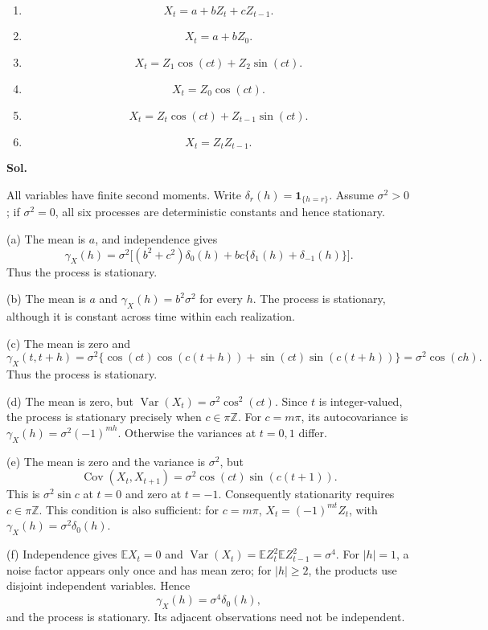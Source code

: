 \documentclass[lang=en,11pt,a4paper,citestyle =authoryear]{elegantpaper}
\begin{document}
\begin{enumerate}
    \item[(a)]
    \[
    X_t=a+bZ_t+cZ_{t-1}.
    \]

    \item[(b)]
    \[
    X_t=a+bZ_0.
    \]

    \item[(c)]
    \[
    X_t=Z_1\cos(ct)+Z_2\sin(ct).
    \]

    \item[(d)]
    \[
    X_t=Z_0\cos(ct).
    \]

    \item[(e)]
    \[
    X_t=Z_t\cos(ct)+Z_{t-1}\sin(ct).
    \]

    \item[(f)]
    \[
    X_t=Z_tZ_{t-1}.
    \]
\end{enumerate}
\vspace{0.5em}
\textbf{Sol.} \par
All variables have finite second moments. Write $\delta_r(h)=\mathbf1_{\{h=r\}}$.
Assume $\sigma^2>0$; if $\sigma^2=0$, all six processes are deterministic constants
and hence stationary.\par
(a) The mean is $a$, and independence gives
\[
\gamma_X(h)=\sigma^2\bigl[(b^2+c^2)\delta_0(h)
+bc\{\delta_1(h)+\delta_{-1}(h)\}\bigr].
\]
Thus the process is stationary.\par
(b) The mean is $a$ and $\gamma_X(h)=b^2\sigma^2$ for every $h$.
The process is stationary, although it is constant across time within each realization.\par
(c) The mean is zero and
\[
\gamma_X(t,t+h)=\sigma^2\{\cos(ct)\cos(c(t+h))+
\sin(ct)\sin(c(t+h))\}=\sigma^2\cos(ch).
\]
Thus the process is stationary.\par
(d) The mean is zero, but $\operatorname{Var}(X_t)=\sigma^2\cos^2(ct)$.
Since $t$ is integer-valued, the process is stationary precisely when
$c\in\pi\mathbb Z$. For $c=m\pi$, its autocovariance is
$\gamma_X(h)=\sigma^2(-1)^{mh}$. Otherwise the variances at $t=0,1$ differ.\par
(e) The mean is zero and the variance is $\sigma^2$, but
\[
\operatorname{Cov}(X_t,X_{t+1})=\sigma^2\cos(ct)\sin(c(t+1)).
\]
This is $\sigma^2\sin c$ at $t=0$ and zero at $t=-1$.
Consequently stationarity requires $c\in\pi\mathbb Z$. This condition is also
sufficient: for $c=m\pi$, $X_t=(-1)^{mt}Z_t$, with
$\gamma_X(h)=\sigma^2\delta_0(h)$.\par
(f) Independence gives $\mathbb E X_t=0$ and
$\operatorname{Var}(X_t)=\mathbb E Z_t^2\mathbb E Z_{t-1}^2=\sigma^4$.
For $|h|=1$, a noise factor appears only once and has mean zero; for
$|h|\ge2$, the products use disjoint independent variables. Hence
\[
\gamma_X(h)=\sigma^4\delta_0(h),
\]
and the process is stationary. Its adjacent observations need not be independent.
\par\vspace{0.5em}
\end{document}
